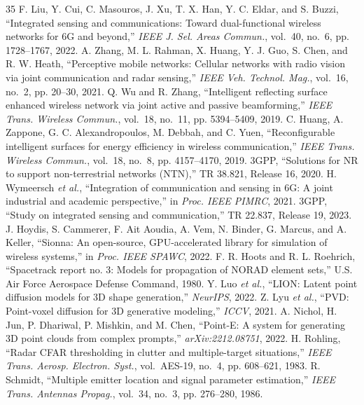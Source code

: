 \documentclass[11pt]{article}
\begin{document}
\begin{thebibliography}{35}
 F. Liu, Y. Cui, C. Masouros, J. Xu, T. X. Han, Y. C. Eldar, and S. Buzzi, ``Integrated sensing and communications: Toward dual-functional wireless networks for 6G and beyond,'' \emph{IEEE J. Sel. Areas Commun.}, vol.~40, no.~6, pp. 1728--1767, 2022.
 A. Zhang, M. L. Rahman, X. Huang, Y. J. Guo, S. Chen, and R. W. Heath, ``Perceptive mobile networks: Cellular networks with radio vision via joint communication and radar sensing,'' \emph{IEEE Veh. Technol. Mag.}, vol.~16, no.~2, pp. 20--30, 2021.
 Q. Wu and R. Zhang, ``Intelligent reflecting surface enhanced wireless network via joint active and passive beamforming,'' \emph{IEEE Trans. Wireless Commun.}, vol.~18, no.~11, pp. 5394--5409, 2019.
 C. Huang, A. Zappone, G. C. Alexandropoulos, M. Debbah, and C. Yuen, ``Reconfigurable intelligent surfaces for energy efficiency in wireless communication,'' \emph{IEEE Trans. Wireless Commun.}, vol.~18, no.~8, pp. 4157--4170, 2019.
 3GPP, ``Solutions for NR to support non-terrestrial networks (NTN),'' TR 38.821, Release 16, 2020.
 H. Wymeersch \emph{et al.}, ``Integration of communication and sensing in 6G: A joint industrial and academic perspective,'' in \emph{Proc. IEEE PIMRC}, 2021.
 3GPP, ``Study on integrated sensing and communication,'' TR 22.837, Release 19, 2023.
 J. Hoydis, S. Cammerer, F. Ait Aoudia, A. Vem, N. Binder, G. Marcus, and A. Keller, ``Sionna: An open-source, GPU-accelerated library for simulation of wireless systems,'' in \emph{Proc. IEEE SPAWC}, 2022.
 F. R. Hoots and R. L. Roehrich, ``Spacetrack report no. 3: Models for propagation of NORAD element sets,'' U.S. Air Force Aerospace Defense Command, 1980.
 Y. Luo \emph{et al.}, ``LION: Latent point diffusion models for 3D shape generation,'' \emph{NeurIPS}, 2022.
 Z. Lyu \emph{et al.}, ``PVD: Point-voxel diffusion for 3D generative modeling,'' \emph{ICCV}, 2021.
 A. Nichol, H. Jun, P. Dhariwal, P. Mishkin, and M. Chen, ``Point-E: A system for generating 3D point clouds from complex prompts,'' \emph{arXiv:2212.08751}, 2022.
 H. Rohling, ``Radar CFAR thresholding in clutter and multiple-target situations,'' \emph{IEEE Trans. Aerosp. Electron. Syst.}, vol.~AES-19, no.~4, pp. 608--621, 1983.
 R. Schmidt, ``Multiple emitter location and signal parameter estimation,'' \emph{IEEE Trans. Antennas Propag.}, vol.~34, no.~3, pp. 276--280, 1986.

\end{thebibliography}
\end{document}
